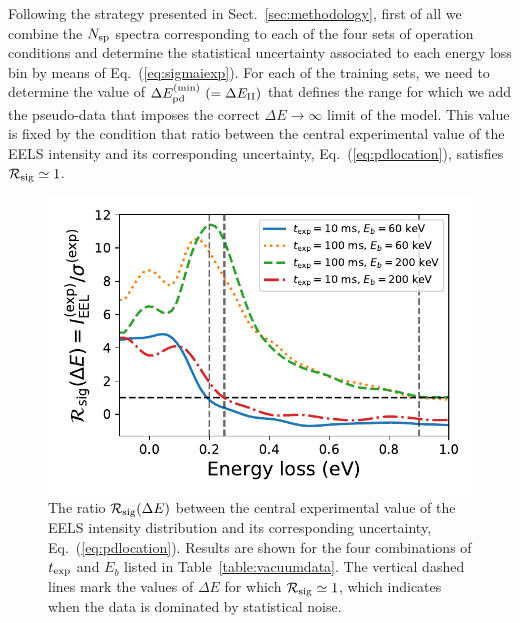 Following the strategy presented in Sect.~\ref{sec:methodology}, first of all we combine the $N_{\rm sp}$ spectra
corresponding to each of the four sets of operation conditions and determine the statistical uncertainty
associated to each energy loss bin by means of Eq.~(\ref{eq:sigmaiexp}).
%
For each of the training sets, we need to determine the value
of $\Delta E_{\rm pd}^{\rm (min)}~(=\Delta E_{\rm II})$
that defines the range for which we add the  pseudo-data
that imposes the correct $\Delta E \to \infty$ limit of the model.
%
This value is fixed by the condition that
ratio between the central experimental value of the 
EELS intensity and its corresponding uncertainty,
Eq.~(\ref{eq:pdlocation}), satisfies $\mathcal{R}_{\rm sig}\simeq 1$.
      
\begin{figure}[t]
  \centering
  \includegraphics[width=125mm]{plots/intensity_to_error_ratio.pdf}
  \caption{\small The ratio $\mathcal{R}_{\rm sig}(\Delta E)$
    between the central experimental value of the 
    EELS intensity distribution and its corresponding
    uncertainty, Eq.~(\ref{eq:pdlocation}).
    Results are shown for the four combinations of $t_{\rm exp}$
    and $E_{b}$ listed in Table~\ref{table:vacuumdata}.
    The vertical dashed lines mark the values of $\Delta E$ for which
    $\mathcal{R}_{\rm sig}\simeq 1$, which indicates when the
    data is dominated by statistical noise.
  }
  \label{fig:intensityratio}
\end{figure}

